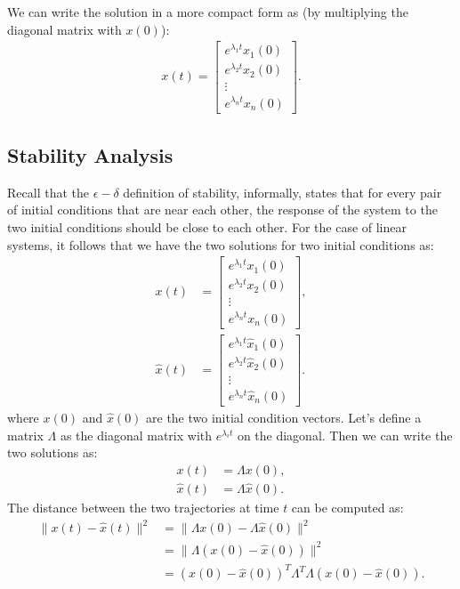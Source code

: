 \documentclass{ee122_notes}
\begin{document}
We can write the solution in a more compact form as (by multiplying the diagonal matrix with $x(0)$):
\begin{align*}
    x(t) = \begin{bmatrix}
        e^{\lambda_1 t} x_1(0) \\
        e^{\lambda_2 t} x_2(0) \\
        \vdots \\
        e^{\lambda_n t} x_n(0)
    \end{bmatrix}.
\end{align*}
\subsection{Stability Analysis}
Recall that the $\epsilon-\delta$ definition of stability, informally, states that for every pair of initial conditions that are near each other, the response of the system to the two initial conditions should be close to each other. For the case of linear systems, it follows that we have the two solutions for two initial conditions as:
\begin{align*}
    x(t) &= \begin{bmatrix}
        e^{\lambda_1 t} x_1(0) \\
        e^{\lambda_2 t} x_2(0) \\
        \vdots \\
        e^{\lambda_n t} x_n(0)
    \end{bmatrix}, \\
    \hat{x}(t) &= \begin{bmatrix}
        e^{\lambda_1 t} \hat{x}_1(0) \\
        e^{\lambda_2 t} \hat{x}_2(0) \\
        \vdots \\
        e^{\lambda_n t} \hat{x}_n(0)
    \end{bmatrix}.
\end{align*}
where $x(0)$ and $\hat{x}(0)$ are the two initial condition vectors. Let's define a matrix $\Lambda$ as the diagonal matrix with $e^{\lambda_i t}$ on the diagonal. Then we can write the two solutions as:
\begin{align*}
    x(t) &= \Lambda x(0), \\
    \hat{x}(t) &= \Lambda \hat{x}(0).
\end{align*}
The distance between the two trajectories at time $t$ can be computed as:
\begin{align*}
    \|x(t) - \hat{x}(t)\|^2 &= \|\Lambda x(0) - \Lambda \hat{x}(0)\|^2 \\
    &= \|\Lambda (x(0) - \hat{x}(0))\|^2 \\
    &= (x(0) - \hat{x}(0))^T \Lambda^T \Lambda (x(0) - \hat{x}(0)).
\end{align*}
\end{document}
